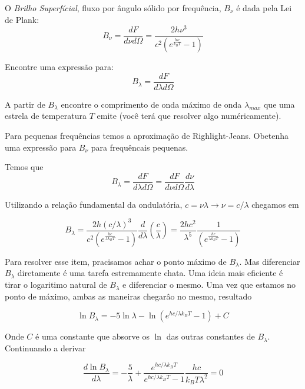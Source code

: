 \documentclass[11pt]{article}
\begin{document}
\begin{pproblem}
    O \textit{Brilho Superfícial}, fluxo por ângulo sólido por frequência, \(B_\nu\) é dada pela Lei de Plank:
    \[B_\nu = \frac{dF}{d\nu d\Omega} = \frac{2h\nu^3}{c^2(e^{\frac{h\nu}{k_BT}}-1)}\] 
    \begin{alternativas}
        \item Encontre uma expressão para:
        \[B_\lambda = \frac{dF}{d\lambda d\Omega}\]
        \item A partir de \(B_\lambda\) encontre o comprimento de onda máximo de onda \(\lambda_{max}\) que uma estrela de temperatura \(T\) emite (você terá que resolver algo numéricamente).
        \item Para pequenas frequências temos a aproximação de Righlight-Jeans. Obetenha uma expressão para \(B_\nu\) para frequêncais pequenas.
        \end{alternativas}

\begin{pssolution*}{}{}
    \begin{alternativas}
        \item Temos que
        \[B_\lambda = \frac{dF}{d\lambda d\Omega} = \frac{dF}{d\nu d\Omega}\frac{d\nu}{d\lambda}\]

        Utilizando a relação fundamental da ondulatória, \(c=\nu\lambda \rightarrow \nu = c/\lambda\) chegamos em 

        \[B_\lambda = \frac{2h(c/\lambda)^3}{c^2(e^{\frac{hc}{\lambda k_BT}}-1)}\frac{d}{d\lambda}\left(\frac{c}{\lambda}\right) = \frac{2hc^2}{\lambda^5}\frac{1}{(e^{\frac{hc}{\lambda k_BT}}-1)}\]

        \item Para resolver esse item, pracisamos achar o ponto máximo de \(B_\lambda\). Mas diferenciar \(B_\lambda\) diretamente é uma tarefa estremamente chata. Uma ideia mais eficiente é tirar o logaritimo natural de \(B_\lambda\) e diferenciar o mesmo. Uma vez que estamos no ponto de máximo, ambas as maneiras chegarâo no mesmo, resultado
        
        \[\ln B_\lambda = -5\ln \lambda - \ln (e^{hc/\lambda k_BT}-1) + C\]

        Onde \(C\) é uma constante que absorve os \(\ln\) das outras constantes de  \(B_\lambda\). Continuando a derivar 

        \[\frac{d \ln B_\lambda}{d\lambda} = -\frac{5}{\lambda} + \frac{e^{hc/\lambda k_BT}}{e^{hc/\lambda k_BT}-1}\frac{hc}{k_BT\lambda^2}=0\]


\end{alternativas}
\end{pssolution*}
\end{pproblem}
\end{document}
